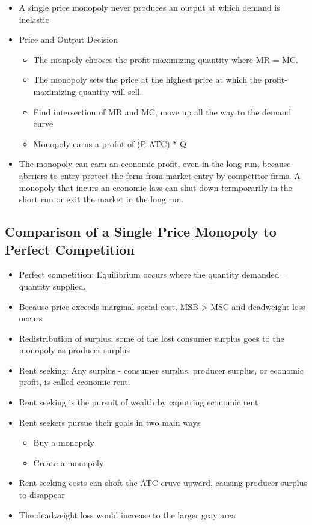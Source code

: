 \documentclass[11pt]{article}
\begin{document}
\begin{itemize}
\begin{itemize}
\end{itemize}
\item A single price monopoly never produces an output at which demand is inelastic
\item Price and Output Decision
\begin{itemize}
\item The monpoly chooses the profit-maximizing quantity where MR = MC.
\item The monopoly sets the price at the highest price at which the profit-maximizing quantity will sell.
\item Find intersection of MR and MC, move up all the way to the demand curve
\item Monopoly earns a profut of (P-ATC) * Q
\end{itemize}
\item The monopoly can earn an economic profit, even in the long run, because abrriers to entry protect the form from market entry by competitor firms. A monopoly that incurs an economic lass can shut down termporarily in the short run or exit the market in the long run.
\end{itemize}
\subsection{Comparison of a Single Price Monopoly to Perfect Competition}
\label{sec:org1da1229}
\begin{itemize}
\item Perfect competition: Equilibrium occurs where the quantity demanded = quantity supplied.
\item Because price exceeds marginal social cost, MSB > MSC and deadweight loss occurs
\item Redistribution of surplus: some of the lost consumer surplus goes to the monopoly as producer surplus
\item Rent seeking: Any surplus - consumer surplus, producer surplus, or economic profit, is called economic rent.
\item Rent seeking is the pursuit of wealth by caputring economic rent
\item Rent seekers pursue their goals in two main ways
\begin{itemize}
\item Buy a monopoly
\item Create a monopoly
\end{itemize}
\item Rent seeking costs can shoft the ATC cruve upward, causing producer surplus to disappear
\item The deadweight loss would increase to the larger gray area
\end{itemize}
\end{document}
